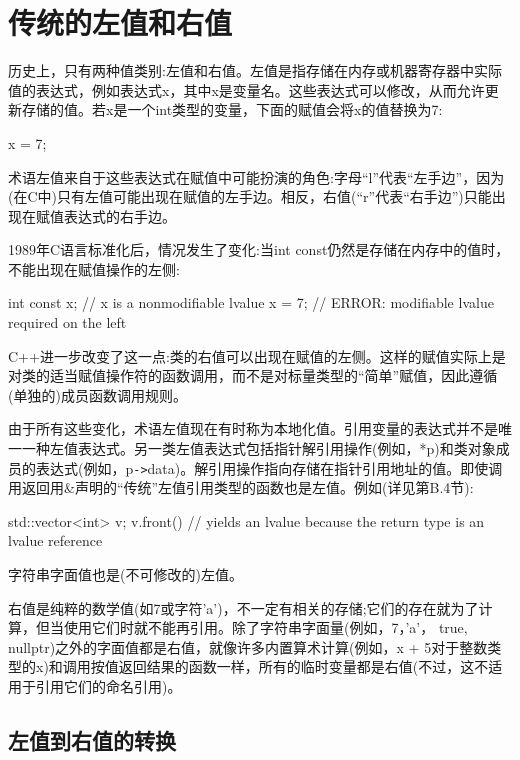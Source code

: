 \section{传统的左值和右值}

历史上，只有两种值类别:左值和右值。左值是指存储在内存或机器寄存器中实际值的表达式，例如表达式x，其中x是变量名。这些表达式可以修改，从而允许更新存储的值。若x是一个int类型的变量，下面的赋值会将x的值替换为7:

\begin{cpp}
x = 7;
\end{cpp}

术语左值来自于这些表达式在赋值中可能扮演的角色:字母“l”代表“左手边”，因为(在C中)只有左值可能出现在赋值的左手边。相反，右值(“r”代表“右手边”)只能出现在赋值表达式的右手边。

1989年C语言标准化后，情况发生了变化:当int const仍然是存储在内存中的值时，不能出现在赋值操作的左侧:

\begin{cpp}
int const x; // x is a nonmodifiable lvalue
x = 7; // ERROR: modifiable lvalue required on the left
\end{cpp}

C++进一步改变了这一点:类的右值可以出现在赋值的左侧。这样的赋值实际上是对类的适当赋值操作符的函数调用，而不是对标量类型的“简单”赋值，因此遵循(单独的)成员函数调用规则。

由于所有这些变化，术语左值现在有时称为本地化值。引用变量的表达式并不是唯一一种左值表达式。另一类左值表达式包括指针解引用操作(例如，*p)和类对象成员的表达式(例如，p\texttt{->}data)。解引用操作指向存储在指针引用地址的值。即使调用返回用\&声明的“传统”左值引用类型的函数也是左值。例如(详见第B.4节):

\begin{cpp}
std::vector<int> v;
v.front() // yields an lvalue because the return type is an lvalue reference
\end{cpp}

字符串字面值也是(不可修改的)左值。

右值是纯粹的数学值(如7或字符'a')，不一定有相关的存储;它们的存在就为了计算，但当使用它们时就不能再引用。除了字符串字面量(例如，7，'a'， true, nullptr)之外的字面值都是右值，就像许多内置算术计算(例如，x + 5对于整数类型的x)和调用按值返回结果的函数一样，所有的临时变量都是右值(不过，这不适用于引用它们的命名引用)。

\subsection{左值到右值的转换}

